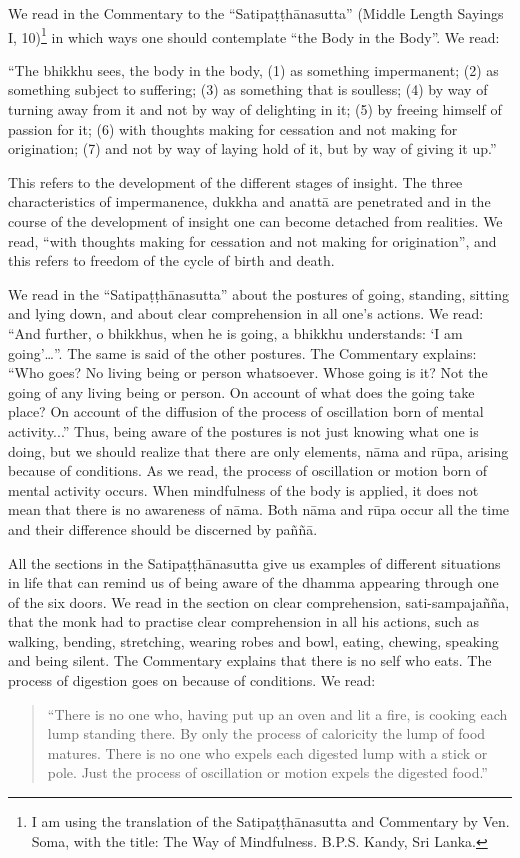 We read in the Commentary to the ``Satipaṭṭhānasutta'' (Middle Length Sayings I,
10)\footnote{I am using the translation of the Satipaṭṭhānasutta and Commentary by Ven. Soma, with the title: The Way of Mindfulness. B.P.S. Kandy, Sri Lanka. } in which ways one should contemplate ``the Body in the Body''. We read:

``The bhikkhu sees, the body in the body, (1) as something impermanent; (2) as something subject to suffering; (3) as something that is soulless; (4) by way of turning away from it and not by way of delighting in it; (5) by freeing himself of passion for it; (6) with thoughts making for cessation and not making for origination; (7) and not by way of laying hold of it, but by way of giving it up.''

This refers to the development of the different stages of insight. The three characteristics of impermanence, dukkha and anattā are penetrated and in the course of the development of insight one can become detached from realities. We read, ``with thoughts making for cessation and not making for origination'', and this refers to freedom of the cycle of birth and death.

We read in the ``Satipaṭṭhānasutta'' about the postures of going, standing, sitting and lying down, and about clear comprehension in all one's actions. We read:
``And further, o bhikkhus, when he is going, a bhikkhu understands: ‘I am going’\ldots''. The same is said of the other postures. The Commentary explains:
``Who goes? No living being or person whatsoever. Whose going is it? Not the going of any living being or person. On account of what does the going take place? On account of the diffusion of the process of oscillation born of mental activity...''
Thus, being aware of the postures is not just knowing what one is doing, but we should realize that there are only elements, nāma and rūpa, arising because of conditions. As we read, the process of oscillation or motion born of mental activity occurs. When mindfulness of the body is applied, it does not mean that there is no awareness of nāma. Both nāma and rūpa occur all the time and their difference should be discerned by paññā.

All the sections in the Satipaṭṭhānasutta give us examples of different situations in life that can remind us of being aware of the dhamma appearing through one of the six doors. We read in the section on clear comprehension, sati-sampajañña, that the monk had to practise clear comprehension in all his actions, such as walking, bending, stretching, wearing robes and bowl, eating, chewing, speaking and being silent.
The Commentary explains that there is no self who eats. The process of digestion goes on because of conditions. We read: 
\begin{quote}
``There is no one who, having put up an oven and lit a fire, is cooking each lump standing there. By only the process of caloricity the lump of food matures. There is no one who expels each digested lump with a stick or pole. Just the process of oscillation or motion expels the digested food.''
\end{quote}

